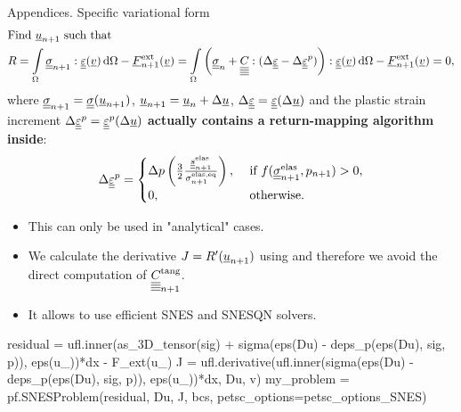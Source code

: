 \documentclass[9pt]{beamer}
\begin{document}
\begin{frame}[fragile]{Appendices. Specific variational form}
  \begin{align}
    & \text{Find } \underline{u}_{n+1} \text{ such that} \label{eqn:cylinder_SNES_var_1} \\
    & R = \int\limits_\Omega \underline{\underline{\sigma}}_{n+1} : \underline{\underline{\varepsilon}}(\underline{v}) \, \mathrm{d}\Omega - \underline{F}_{n+1}^\text{ext}(\underline{v}) = \int\limits_\Omega \left( \underline{\underline{\sigma}}_n + \underline{\underline{\underline{\underline{C_{}}}}} : (\Delta\underline{\underline{\varepsilon}} - \Delta\underline{\underline{\varepsilon}}^p) \right) : \underline{\underline{\varepsilon}}(\underline{v}) \, \mathrm{d}\Omega - \underline{F}_{n+1}^\text{ext}(\underline{v}) = 0, \label{eqn:cylinder_SNES_var_2}
  \end{align}
  where $\underline{\underline{\sigma}}_{n+1} = \underline{\underline{\sigma}}(\underline{u}_{n+1})$, $\underline{u}_{n+1} = \underline{u}_{n} + \Delta\underline{u}$, $\Delta\underline{\underline{\varepsilon}} = \underline{\underline{\varepsilon}}(\Delta\underline{u})$ and the plastic strain increment $\Delta\underline{\underline{\varepsilon}}^p = \underline{\underline{\varepsilon}}^p(\Delta\underline{u})$ \textbf{actually contains a return-mapping algorithm inside}:
  \begin{equation}
      \Delta\underline{\underline{\varepsilon}}^p = 
          \begin{cases}
              \Delta p \left( \frac{3}{2}\frac{\underline{\underline{s}}_{n+1}^\text{elas}} {\sigma_{n+1}^\text{elas,eq}} \right), & \text{ if } f(\underline{\underline{\sigma}}_{n+1}^{\text{elas}}, p_{n+1}) > 0,  \\
              0, & \text{ otherwise}.
          \end{cases}
  \end{equation}
  \begin{itemize}
    \item This can only be used in "analytical" cases.
    \item We calculate the derivative $J = R^\prime(\underline{u}_{n+1})$ using  and therefore we avoid the direct computation of $\underline{\underline{\underline{\underline{C_{}}}}}^\text{tang}_{n+1}$.
    \item It allows to use efficient SNES and SNESQN solvers.
  \end{itemize}
  \begin{pythoncode}
    residual = ufl.inner(as_3D_tensor(sig) + sigma(eps(Du) - deps_p(eps(Du), sig, p)), eps(u_))*dx - F_ext(u_)
    J = ufl.derivative(ufl.inner(sigma(eps(Du) - deps_p(eps(Du), sig, p)), eps(u_))*dx, Du, v)
    my_problem = pf.SNESProblem(residual, Du, J, bcs, petsc_options=petsc_options_SNES)
  \end{pythoncode}
\end{frame}
\end{document}
